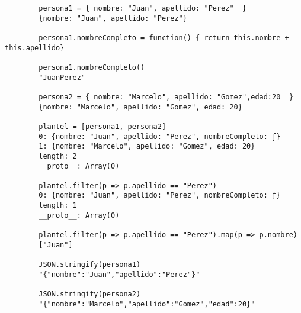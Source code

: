 \begin{verbatim}
        persona1 = { nombre: "Juan", apellido: "Perez"  }
        {nombre: "Juan", apellido: "Perez"}

        persona1.nombreCompleto = function() { return this.nombre + this.apellido}

        persona1.nombreCompleto()
        "JuanPerez"

        persona2 = { nombre: "Marcelo", apellido: "Gomez",edad:20  }
        {nombre: "Marcelo", apellido: "Gomez", edad: 20}

        plantel = [persona1, persona2]
        0: {nombre: "Juan", apellido: "Perez", nombreCompleto: ƒ}
        1: {nombre: "Marcelo", apellido: "Gomez", edad: 20}
        length: 2
        __proto__: Array(0)

        plantel.filter(p => p.apellido == "Perez")
        0: {nombre: "Juan", apellido: "Perez", nombreCompleto: ƒ}
        length: 1
        __proto__: Array(0)

        plantel.filter(p => p.apellido == "Perez").map(p => p.nombre)
        ["Juan"]

        JSON.stringify(persona1)
        "{"nombre":"Juan","apellido":"Perez"}"

        JSON.stringify(persona2)
        "{"nombre":"Marcelo","apellido":"Gomez","edad":20}"
\end{verbatim}
